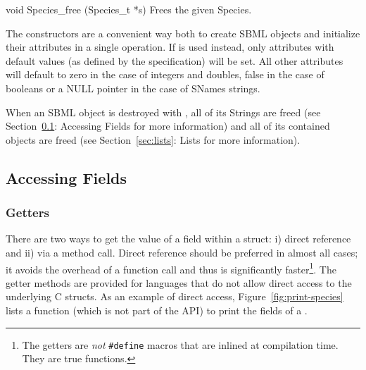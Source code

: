 \documentclass{cekmanual}
\begin{document}
\begin{methoddef}{void Species\_free (Species\_t *s)}
  Frees the given Species.
\end{methoddef}


The  constructors are a convenient way both
to create SBML objects and initialize their attributes in a single
operation.  If  is used instead, only attributes
with default values (as defined by the specification) will be set.
All other attributes will default to zero in the case of integers and
doubles, false in the case of booleans or a NULL pointer in the case
of SNames strings.

When an SBML object is destroyed with , all of its
Strings are freed (see Section~\ref{sec:accessing-fields}: Accessing
Fields for more information) and all of its contained objects are
freed (see Section~\ref{sec:lists}: Lists for more information).


\subsection{Accessing Fields}
\label{sec:accessing-fields}


\subsubsection{Getters}

There are two ways to get the value of a field within a struct: i)
direct reference and ii) via a method call.  Direct reference should
be preferred in almost all cases; it avoids the overhead of a function
call and thus is significantly faster\footnote{The getters are
\emph{not} \texttt{\#define} macros that are inlined at compilation
time.  They are true functions.}.  The getter methods are provided for
languages that do not allow direct access to the underlying C structs.
As an example of direct access, Figure~\ref{fig:print-species} lists a
function (which is not part of the API) to print the fields of a
.
\end{document}
